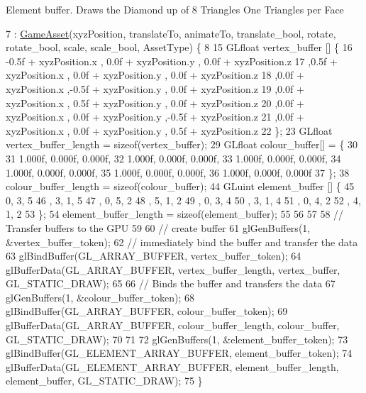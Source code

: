 Element buffer. Draws the Diamond up of 8 Triangles One Triangles per Face
\begin{DoxyCode}
7 : \hyperlink{class_game_asset_a9de932075d9b4263e7fb24fbfd163a61}{GameAsset}(xyzPosition, translateTo, animateTo, translate\_bool, rotate, rotate\_bool, scale, 
      scale\_bool, AssetType) \{
8 
15   GLfloat vertex\_buffer [] \{
16      -0.5f + xyzPosition.x  , 0.0f + xyzPosition.y   , 0.0f + xyzPosition.z
17      ,0.5f + xyzPosition.x  , 0.0f + xyzPosition.y   , 0.0f + xyzPosition.z
18      ,0.0f + xyzPosition.x  ,-0.5f + xyzPosition.y   , 0.0f + xyzPosition.z
19      ,0.0f + xyzPosition.x  , 0.5f + xyzPosition.y   , 0.0f + xyzPosition.z
20      ,0.0f + xyzPosition.x  , 0.0f + xyzPosition.y   ,-0.5f + xyzPosition.z
21      ,0.0f + xyzPosition.x  , 0.0f + xyzPosition.y   , 0.5f + xyzPosition.z
22   \};
23   GLfloat vertex\_buffer\_length = \textcolor{keyword}{sizeof}(vertex\_buffer);
29   GLfloat colour\_buffer[] = \{
30 
31      1.000f, 0.000f, 0.000f,
32      1.000f, 0.000f, 0.000f,
33      1.000f, 0.000f, 0.000f,
34      1.000f, 0.000f, 0.000f,
35      1.000f, 0.000f, 0.000f,
36      1.000f, 0.000f, 0.000f
37   \};
38   colour\_buffer\_length = \textcolor{keyword}{sizeof}(colour\_buffer);
44   GLuint element\_buffer []  \{
45       0, 3, 5   
46     , 3, 1, 5
47     , 0, 5, 2   
48     , 5, 1, 2
49     , 0, 3, 4
50     , 3, 1, 4
51     , 0, 4, 2
52     , 4, 1, 2
53   \};
54   element\_buffer\_length = \textcolor{keyword}{sizeof}(element\_buffer);
55 
56 
57 
58   \textcolor{comment}{// Transfer buffers to the GPU}
59 
60   \textcolor{comment}{// create buffer}
61   glGenBuffers(1, &vertex\_buffer\_token);
62   \textcolor{comment}{// immediately bind the buffer and transfer the data}
63   glBindBuffer(GL\_ARRAY\_BUFFER, vertex\_buffer\_token);
64   glBufferData(GL\_ARRAY\_BUFFER, vertex\_buffer\_length, vertex\_buffer, GL\_STATIC\_DRAW);
65 
66   \textcolor{comment}{// Binds the buffer and transfers the data}
67   glGenBuffers(1, &colour\_buffer\_token);
68   glBindBuffer(GL\_ARRAY\_BUFFER, colour\_buffer\_token);
69   glBufferData(GL\_ARRAY\_BUFFER, colour\_buffer\_length, colour\_buffer, GL\_STATIC\_DRAW);
70 
71 
72   glGenBuffers(1, &element\_buffer\_token);
73   glBindBuffer(GL\_ELEMENT\_ARRAY\_BUFFER, element\_buffer\_token);
74   glBufferData(GL\_ELEMENT\_ARRAY\_BUFFER, element\_buffer\_length, element\_buffer, GL\_STATIC\_DRAW);
75 \}
\end{DoxyCode}
\hypertarget{class_diamond_asset_a1b7bf6ba76651a9304943f2c41fe36b8}{}
